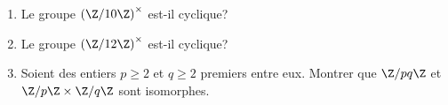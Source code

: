 \begin{enonce}
\begin{exercise}[ID={RMS133 E1273},subtitle={IMT MP 2022},tags={},difficulty={}]
\begin{enumerate}
  \item Le groupe $\left( \Z / 10\Z \right)^\times$ est-il cyclique?
  \item Le groupe $\left( \Z / 12\Z \right)^\times$ est-il cyclique?
  \item Soient des entiers $p\geq 2$ et $q\geq 2$ premiers entre eux.
    Montrer que $\Z / pq\Z$ et $\Z/p\Z \times \Z/q\Z$ sont isomorphes.
\end{enumerate}
\end{exercise}
\begin{solution}
\end{solution}
\end{enonce}
